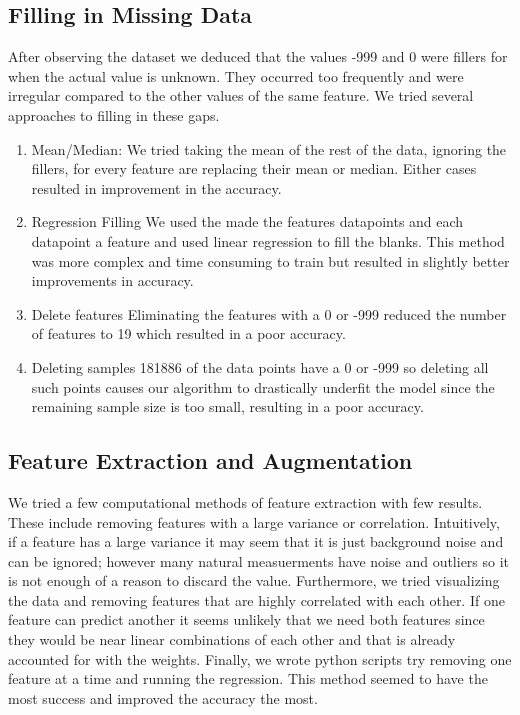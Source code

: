 \documentclass[10pt,conference,compsocconf]{IEEEtran}
\begin{document}
\subsection{Filling in Missing Data}
After observing the dataset we deduced that the values -999 and 0 were fillers for when the actual value is unknown. They occurred too frequently and were irregular compared to the other values of the same feature. We tried several approaches to filling in these gaps.
\begin{enumerate}
\item Mean/Median: We tried taking the mean of the rest of the data, ignoring the fillers, for every feature are replacing their mean or median. Either cases resulted in improvement in the accuracy.
\item Regression Filling
	We used the made the features datapoints and each datapoint a feature and used linear regression to fill the blanks. This method was more complex and time consuming to train but resulted in slightly better improvements in accuracy.
\item Delete features
	Eliminating the features with a 0 or -999 reduced the number of features to 19 which resulted in a poor accuracy.
\item Deleting samples
	181886 of the data points have a 0 or -999 so deleting all such points causes our algorithm to drastically underfit the model since the remaining sample size is too small, resulting in a poor accuracy.
\end{enumerate}

\subsection{Feature Extraction and Augmentation}
We tried a few computational methods of feature extraction with few results. These include removing features with a large variance or correlation. Intuitively, if a feature has a large variance it may seem that it is just background noise and can be ignored; however many natural measuerments have noise and outliers so it is not enough of a reason to discard the value. Furthermore, we tried visualizing the data and removing features that are highly correlated with each other. If one feature can predict another it seems unlikely that we need both features since they would be near linear combinations of each other and that is already accounted for with the weights. Finally, we wrote python scripts try removing one feature at a time and running the regression. This method seemed to have the most success and improved the accuracy the most.
\end{document}
